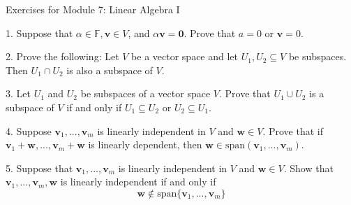\documentclass{article}
\theoremstyle{remark} %
\newcommand{\bv}{{\mathbf{v}}}
\newcommand{\bw}{{\mathbf{w}}}
\newcommand{\zerovec}{{\mathbf{0}}}
\newcommand{\F}{{\mathbb{F}}}
\begin{document}
\begin{center}
\Large{Exercises for Module 7: Linear Algebra I}
\end{center}

1. Suppose that $\alpha\in\F, \bv\in V$, and $\alpha \bv=\zerovec$. Prove that $a=0$ or $\bv=0$.

\vspace{10cm} %


2.  Prove the following:  Let $V$ be a vector space and let $U_1, U_2 \subseteq V$ be subspaces. Then $U_1 \cap U_2$ is also a subspace of $V$. 

\vspace{12cm} %



3. Let $U_1$ and $U_2$ be subspaces of a vector space $V$. Prove that $U_1 \cup U_2$ is a subspace of $V$ if and only if $U_1 \subseteq U_2$ or $U_2 \subseteq U_1$.
\vspace{11cm} %





4.  Suppose $\bv_{1},...,\bv_{m}$ is linearly independent in $V$ and $\bw\in V$. Prove that if $\bv_{1}+\bw,...,\bv_{m}+\bw$ is linearly dependent, then $\bw\in\text{span}(\bv_{1},...,\bv_{m})$. 

\vspace{11cm} %




5. Suppose that $\bv_{1},...,\bv_{m}$ is linearly independent
in $V$ and $\bw\in V$. Show that $\bv_{1},...,\bv_{m},\bw$ is linearly independent if and only if 
$$\bw\notin\text{span}\{\bv_{1},...,\bv_{m}\}$$

\vspace{11cm} %

\end{document}
